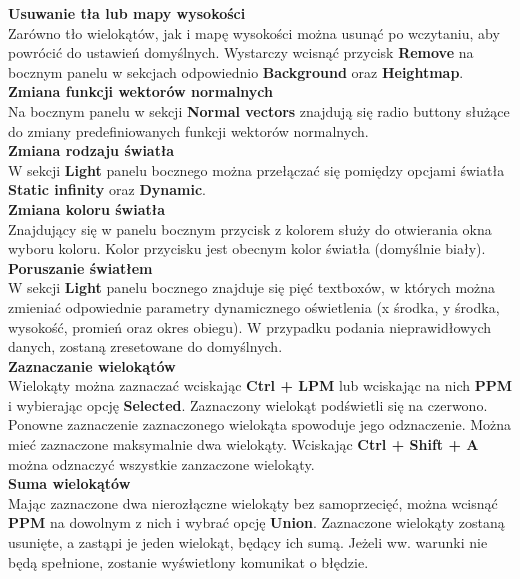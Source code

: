 \documentclass[12pt]{article}
\begin{document}
\textbf{Usuwanie tła lub mapy wysokości}\\Zarówno tło wielokątów, jak i mapę wysokości można usunąć po wczytaniu, aby powrócić do ustawień domyślnych. Wystarczy wcisnąć przycisk \textbf{Remove} na bocznym panelu w sekcjach odpowiednio \textbf{Background} oraz \textbf{Heightmap}.\\[\baselineskip]
\textbf{Zmiana funkcji wektorów normalnych}\\Na bocznym panelu w sekcji \textbf{Normal vectors} znajdują się radio buttony służące do zmiany predefiniowanych funkcji wektorów normalnych.\\[\baselineskip]
\textbf{Zmiana rodzaju światła}\\W sekcji \textbf{Light} panelu bocznego można przełączać się pomiędzy opcjami światła \textbf{Static infinity} oraz \textbf{Dynamic}.\\[\baselineskip]
\textbf{Zmiana koloru światła}\\Znajdujący się w panelu bocznym przycisk z kolorem służy do otwierania okna wyboru koloru. Kolor przycisku jest obecnym kolor światła (domyślnie biały).\\[\baselineskip]
\textbf{Poruszanie światłem}\\W sekcji \textbf{Light} panelu bocznego znajduje się pięć textboxów, w których można zmieniać odpowiednie parametry dynamicznego oświetlenia (x środka, y środka, wysokość, promień oraz okres obiegu). W przypadku podania nieprawidłowych danych, zostaną zresetowane do domyślnych.\\[\baselineskip]
\textbf{Zaznaczanie wielokątów}\\Wielokąty można zaznaczać wciskając \textbf{Ctrl + LPM} lub wciskając na nich \textbf{PPM} i wybierając opcję \textbf{Selected}. Zaznaczony wielokąt podświetli się na czerwono. Ponowne zaznaczenie zaznaczonego wielokąta spowoduje jego odznaczenie. Można mieć zaznaczone maksymalnie dwa wielokąty. Wciskając \textbf{Ctrl + Shift + A} można odznaczyć wszystkie zanzaczone wielokąty.\\[\baselineskip]
\textbf{Suma wielokątów}\\Mając zaznaczone dwa nierozłączne wielokąty bez samoprzecięć, można wcisnąć \textbf{PPM} na dowolnym z nich i wybrać opcję \textbf{Union}. Zaznaczone wielokąty zostaną usunięte, a zastąpi je jeden wielokąt, będący ich sumą. Jeżeli ww. warunki nie będą spełnione, zostanie wyświetlony komunikat o błędzie.
\end{document}
